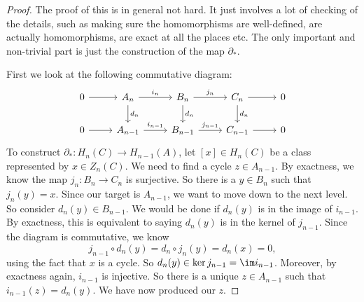 \documentclass[a4paper]{article}
\begin{document}
\begin{proof}
  The proof of this is in general not hard. It just involves a lot of checking of the details, such as making sure the homomorphisms are well-defined, are actually homomorphisms, are exact at all the places etc. The only important and non-trivial part is just the construction of the map $\partial_*$.

  First we look at the following commutative diagram:
  \[
    \begin{tikzcd}
      0 \ar[r] & A_n \ar[r, "i_n"] \ar[d, "d_n"] & B_n \ar[r, "j_n"] \ar[d, "d_n"] & C_n \ar[r] \ar[d, "d_n"] & 0\\
      0 \ar[r] & A_{n - 1} \ar[r, "i_{n - 1}"] & B_{n - 1} \ar[r, "j_{n - 1}"] & C_{n - 1} \ar[r] & 0
    \end{tikzcd}
  \]
  To construct $\partial_*: H_n(C) \to H_{n - 1}(A)$, let $[x] \in H_n(C)$ be a class represented by $x \in Z_n(C)$. We need to find a cycle $z \in A_{n - 1}$. By exactness, we know the map $j_n: B_n \to C_n$ is surjective. So there is a $y \in B_n$ such that $j_n(y) = x$. Since our target is $A_{n - 1}$, we want to move down to the next level. So consider $d_n(y) \in B_{n - 1}$. We would be done if $d_n(y)$ is in the image of $i_{n - 1}$. By exactness, this is equivalent to saying $d_n(y)$ is in the kernel of $j_{n -1 }$. Since the diagram is commutative, we know
  \[
    j_{n - 1}\circ d_n(y) = d_n \circ j_n (y) = d_n(x) = 0,
  \]
  using the fact that $x$ is a cycle. So $d_n (y) \in \ker j_{n - 1} = \im i_{n - 1}$. Moreover, by exactness again, $i_{n - 1}$ is injective. So there is a unique $z \in A_{n - 1}$ such that $i_{n - 1}(z) = d_n(y)$. We have now produced our $z$.


\end{proof}
\end{document}

